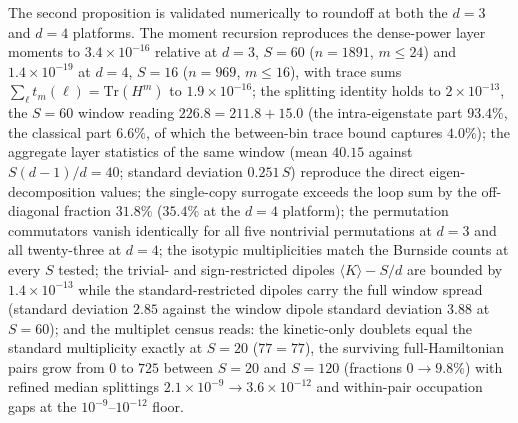 \documentclass[11pt,a4paper]{article}
\theoremstyle{plain}
\theoremstyle{definition}
\theoremstyle{remark}
\begin{document}
The second proposition is validated numerically to roundoff at both the
$d=3$ and $d=4$ platforms. The moment recursion reproduces the dense-power
layer moments to $3.4\times10^{-16}$ relative at $d=3$, $S=60$
($n=1891$, $m\le24$) and $1.4\times10^{-19}$ at $d=4$, $S=16$
($n=969$, $m\le16$), with trace sums $\sum_{\ell}t_m(\ell)=
\mathrm{Tr}(H^{m})$ to $1.9\times10^{-16}$; the splitting identity holds
to $2\times10^{-13}$, the $S=60$ window reading
$226.8=211.8+15.0$ (the intra-eigenstate part $93.4\%$, the classical
part $6.6\%$, of which the between-bin trace bound captures $4.0\%$); the
aggregate layer statistics of the same window (mean $40.15$ against
$S(d-1)/d=40$; standard deviation $0.251\,S$) reproduce the direct
eigen-decomposition values; the single-copy surrogate exceeds the loop sum
by the off-diagonal fraction $31.8\%$ ($35.4\%$ at the $d=4$ platform);
the permutation commutators vanish identically for all five nontrivial
permutations at $d=3$ and all twenty-three at $d=4$; the isotypic
multiplicities match the Burnside counts at every $S$ tested; the
trivial- and sign-restricted dipoles $\langle K\rangle-S/d$ are bounded
by $1.4\times10^{-13}$ while the standard-restricted dipoles carry the
full window spread (standard deviation $2.85$ against the window dipole
standard deviation $3.88$ at $S=60$); and the multiplet census reads:
the kinetic-only doublets equal the standard multiplicity exactly at
$S=20$ ($77=77$), the surviving full-Hamiltonian pairs grow from $0$ to
$725$ between $S=20$ and $S=120$ (fractions $0\to9.8\%$) with refined
median splittings $2.1\times10^{-9}\to3.6\times10^{-12}$ and
within-pair occupation gaps at the $10^{-9}$--$10^{-12}$ floor.
\end{document}
